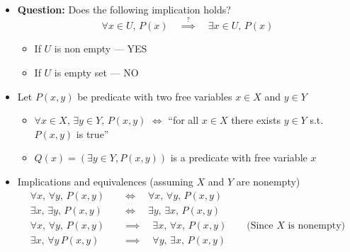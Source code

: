 \documentclass[11pt,twoside]{report}
\begin{document}
\begin{itemize}
\item \textbf{Question:} Does the following implication holds? 
\[
\forall x\in U , \, P(x) \quad \overset{?}{\implies}  \quad \exists x\in U , \, P(x)
\]
\begin{itemize}
\item If $U$ is non empty --- YES
\item If $U$ is empty set --- NO
\end{itemize}

\item Let $P(x,y)$ be predicate with two free variables $x \in X$ and $ y \in Y$
\begin{itemize}
\item $\forall x \in X,\,  \exists y \in Y,  \, P(x,y)$  $\iff$  ``for all $x \in X$ there exists $y \in Y$ s.t.\ $P(x,y)$ is true''
\item  $Q(x) = ( \exists y \in Y, P(x,y))$ is a predicate with free variable $x$
\end{itemize}


\item Implications and equivalences (assuming $X$ and $Y$ are nonempty) 
\begin{align*}
 \forall x, \, \forall y,\,  P(x,y)  \quad & \iff   \quad  \forall x, \, \forall y,\,  P(x,y)  \\
\exists x, \,\exists y,\,  P(x,y)  \quad & \iff   \quad \exists y, \, \exists x,\,  P(x,y)  \\
   \forall x, \, \forall y,\,  P(x,y)  \quad & \implies   \quad  \exists x , \, \forall x,\,  P(x,y)   \qquad  \text{(Since $X$ is nonempty)}\\
\exists x, \, \forall y\,  P(x,y)  \quad & \implies   \quad  \forall y, \, \exists x,\,  P(x,y)  
\end{align*}





\end{itemize}
\end{document}
